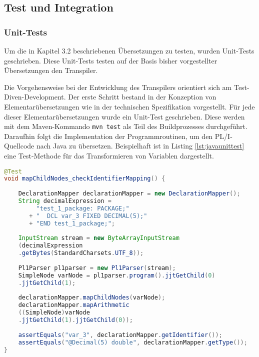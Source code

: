 \pagebreak
\subsection{Test und Integration}
\subsubsection{Unit-Tests}

Um die in Kapitel 3.2 beschriebenen Übersetzungen zu testen, wurden Unit-Tests geschrieben. 
Diese Unit-Tests testen auf der Basis bisher vorgestellter Übersetzungen den Transpiler.

Die Vorgehensweise bei der Entwicklung des Transpilers orientiert sich am Test-Diven-Development. 
Der erste Schritt bestand in der Konzeption von Elementarübersetzungen wie in der technischen Spezifikation vorgestellt.
Für jede dieser Elementarübersetzungen wurde ein Unit-Test geschrieben. Diese werden mit dem Maven-Kommando \verb+mvn test+ als Teil des Buildprozesses durchgeführt. Daraufhin folgt die Implementation der Programmroutinen, um den PL/I-Quellcode nach Java zu übersetzen.
Beispielhaft ist in Listing \ref{lst:javaunittest} eine Test-Methode für das Transformieren von Variablen dargestellt.

\begin{lstlisting}[language=Java, caption=Arithmetic Node Unit-test, label={lst:javaunittest}]
@Test
void mapChildNodes_checkIdentifierMapping() {
	
	DeclarationMapper declarationMapper = new DeclarationMapper();
	String decimalExpression = 
		 "test_1_package: PACKAGE;" 
	   + "	DCL var_3 FIXED DECIMAL(5);" 
	   + "END test_1_package;";
	
	InputStream stream = new ByteArrayInputStream
	(decimalExpression
	.getBytes(StandardCharsets.UTF_8));
	
	Pl1Parser pl1parser = new Pl1Parser(stream);
	SimpleNode varNode = pl1parser.program().jjtGetChild(0)
	.jjtGetChild(1);
		
	declarationMapper.mapChildNodes(varNode);
	declarationMapper.mapArithmetic
	((SimpleNode)varNode
	.jjtGetChild(1).jjtGetChild(0));
		
	assertEquals("var_3", declarationMapper.getIdentifier());
	assertEquals("@Decimal(5) double", declarationMapper.getType());
}
\end{lstlisting} 

